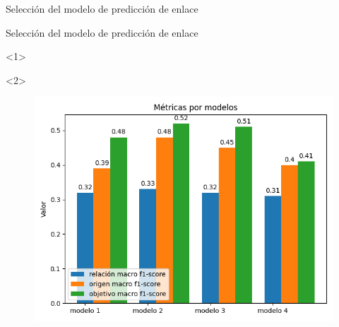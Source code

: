 \documentclass{beamer}
\begin{document}
\begin{frame}{Selección del modelo de predicción de enlace}
\end{frame}
\begin{frame}{Selección del modelo de predicción de enlace}
    \begin{onlyenv}<1>
        \begin{table}
            \begin{center}
            \caption{Variantes de arquitectura de los modelos de predicción de enlaces.}\label{table:link_predictor_architecture_table}
            \end{center}
        \end{table}
    \end{onlyenv}
    \begin{onlyenv}<2>
        \begin{figure}
            \includegraphics[scale=0.6]{Graphics/persuasive_essays_all_linked_all_relation_f1_scores.png}

\end{figure}
\end{onlyenv}
\end{frame}
\end{document}
